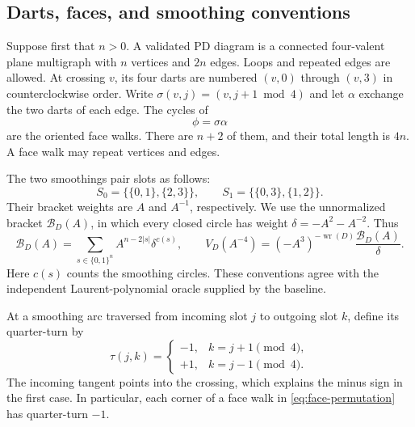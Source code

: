 \documentclass[11pt]{article}
\theoremstyle{definition}
\theoremstyle{remark}
\begin{document}
\subsection{Darts, faces, and smoothing conventions}

Suppose first that $n>0$. A validated PD diagram is a connected four-valent
plane multigraph with $n$ vertices and $2n$ edges. Loops and repeated edges
are allowed. At crossing $v$, its four darts are numbered $(v,0)$ through
$(v,3)$ in counterclockwise order. Write $\sigma(v,j)=(v,j+1\bmod4)$ and
let $\alpha$ exchange the two darts of each edge. The cycles of
\begin{equation}\label{eq:face-permutation}
 \phi=\sigma\alpha
\end{equation}
are the oriented face walks. There are $n+2$ of them, and their total length
is $4n$. A face walk may repeat vertices and edges.

The two smoothings pair slots as follows:
\[
 S_0=\{\{0,1\},\{2,3\}\},\qquad
 S_1=\{\{0,3\},\{1,2\}\}.
\]
Their bracket weights are $A$ and $A^{-1}$, respectively. We use the
unnormalized bracket $\mathcal B_D(A)$, in which every closed circle has
weight $\delta=-A^2-A^{-2}$. Thus
\begin{equation}\label{eq:bracket-state-sum}
 \mathcal B_D(A)=\sum_{s\in\{0,1\}^n}
      A^{n-2|s|}\delta^{c(s)},
 \qquad
 V_D(A^{-4})=(-A^3)^{-\operatorname{wr}(D)}
                   \frac{\mathcal B_D(A)}{\delta}.
\end{equation}
Here $c(s)$ counts the smoothing circles. These conventions agree with the
independent Laurent-polynomial oracle supplied by the baseline.

At a smoothing arc traversed from incoming slot $j$ to outgoing slot $k$,
define its quarter-turn by
\begin{equation}\label{eq:corner-turn}
 \tau(j,k)=
 \begin{cases}
 -1,&k=j+1\pmod4,\\
 +1,&k=j-1\pmod4.
 \end{cases}
\end{equation}
The incoming tangent points into the crossing, which explains the minus
sign in the first case. In particular, each corner of a face walk in
\eqref{eq:face-permutation} has quarter-turn $-1$.
\end{document}
